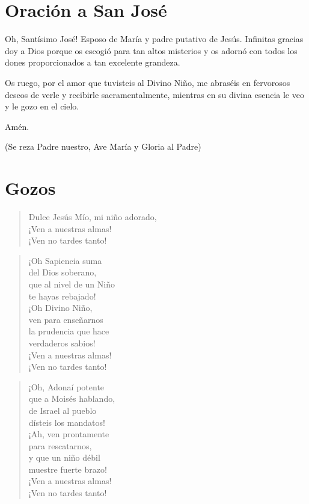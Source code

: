 \documentclass[spanish,utf8,12pt]{chlart}
\newenvironment{lectura}{\begingroup\color{lector}}{\endgroup\par}
\newenvironment{finalnotes}{\begingroup
	\footnotesize\sffamily\color{Gray}%
	\setlength{\leftskip}{3em}\setlength{\rightskip}{3em}\noindent
	}{\par\endgroup}
\newenvironment{gozo}{\begin{verse}\color{lector}}{\end{verse}}
\newcommand*\vena{{\color{responden}\hspace{1em}¡Ven a nuestras almas!\\\hspace{1em}¡Ven no tardes tanto!}}
\begin{document}
\section{Oración a San José}
\begin{lectura}
Oh, Santísimo José!
Esposo de María y padre putativo de Jesús.
Infinitas gracias doy a Dios porque os escogió para tan altos misterios
y os adornó con todos los dones proporcionados a tan excelente grandeza.

Os ruego, por el amor que tuvisteis al Divino Niño, me abraséis en
fervorosos deseos de verle y recibirle sacramentalmente, mientras en su
divina esencia le veo y le gozo en el cielo.

Amén.
\end{lectura}
\begin{finalnotes}
(Se reza Padre nuestro, Ave María y Gloria al Padre)
\end{finalnotes}

\section{Gozos}

\begin{gozo}
Dulce Jesús Mío, mi niño adorado,\\
\vena
\end{gozo}

\begin{gozo}
¡Oh Sapiencia suma\\del Dios soberano,\\
que al nivel de un Niño\\te hayas rebajado!\\
¡Oh Divino Niño,\\ven para enseñarnos\\
la prudencia que hace\\verdaderos sabios!\\
\vena
\end{gozo}

\begin{gozo}
¡Oh, Adonaí potente\\
que a Moisés hablando,\\
de Israel al pueblo\\
dísteis los mandatos!\\
¡Ah, ven prontamente\\
para rescatarnos,\\
y que un niño débil\\
muestre fuerte brazo!\\
\vena
\end{gozo}
\end{document}
